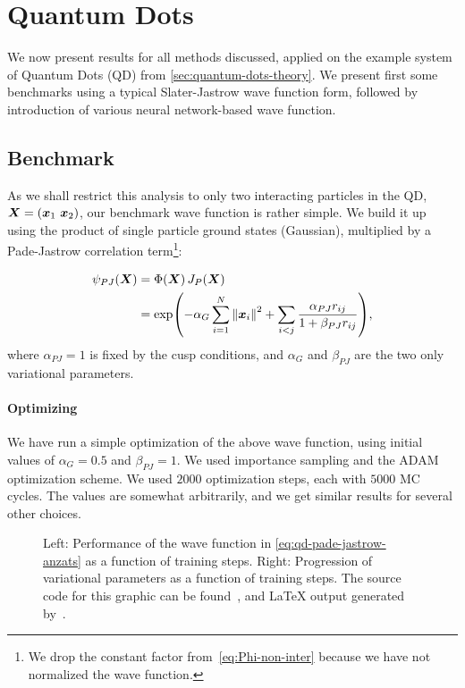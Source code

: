 \documentclass[Thesis.tex]{subfiles}
\begin{document}
\chapter{Quantum Dots}
\label{chp:quantum-dots}

We now present results for all methods discussed, applied on the example system
of Quantum Dots (QD) from \cref{sec:quantum-dots-theory}. We present first some
benchmarks using a typical Slater-Jastrow wave function form, followed by
introduction of various neural network-based wave function.

\section{Benchmark}

As we shall restrict this analysis to only two interacting particles in the QD,
$\bm{X} = (\bm{x}_1\ \bm{x}_2)$, our benchmark wave function is rather simple. We build
it up using the product of single particle ground states (Gaussian), multiplied
by a Pade-Jastrow correlation term\footnote{We drop the constant factor
  from~\cref{eq:Phi-non-inter} because we have not normalized the wave function.}:

\begin{align}
  \label{eq:qd-pade-jastrow-anzats}
  \psi_{PJ}(\bm{X}) &= \Phi(\bm{X}) \,J_P(\bm{X})\\
  &= \exp(-\alpha_G\sum_{i=1}^N \norm{\bm{x}_i}^2 + \sum_{i < j} \frac{\alpha_{PJ}
    r_{ij}}{1 + \beta_{PJ} r_{ij}}),
\end{align}
where $\alpha_{PJ} = 1$ is fixed by the cusp conditions, and $\alpha_G$ and $\beta_{PJ}$
are the two only variational parameters.

\subsubsection{Optimizing}

We have run a simple optimization of the above wave function, using initial
values of $\alpha_G = 0.5$ and $\beta_{PJ} = 1$. We used importance sampling and the
ADAM optimization scheme. We used $\num{2000}$ optimization steps, each with
$\num{5000}$ MC cycles. The values are somewhat arbitrarily, and we get
similar results for several other choices.

\begin{figure}[h]
   \centering
    \resizebox{\linewidth}{!}{%
        
    }
    \caption{\label{fig:QD-benchmark-pade-jastrow-training}Left: Performance of the
      wave function in \cref{eq:qd-pade-jastrow-anzats} as a function of
      training steps. Right: Progression of variational parameters as a function
      of training steps. The source code for this graphic can be found~\cite[TODO: Add
    path]{MS-thesis-repository}, and \LaTeX{} output generated
    by~\cite{nico_schlomer_2018_1173090}.}
\end{figure}
\end{document}
